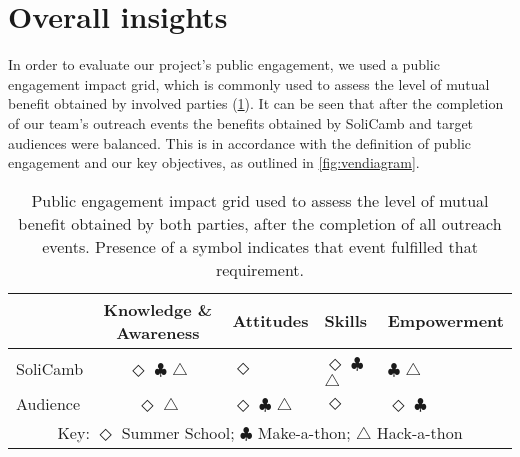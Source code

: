 \section{Overall insights}
 In order to evaluate our project's public engagement, we used a public engagement impact grid, which is commonly used to assess the level of mutual benefit obtained by involved parties (\cref{tab:impact_grid}). It can be seen that after the completion of our team's outreach events the benefits obtained by SoliCamb and target audiences were balanced. This is in accordance with the definition of public engagement and our key objectives, as outlined in \cref{fig:vendiagram}. %
 
\begin{table}[h!]
	\centering
	\begin{tabular}{l c l l l}
			\toprule
			& {Knowledge \& Awareness} 
			& {Attitudes} 
			& {Skills} 
			& {Empowerment} \\
			\midrule
			SoliCamb & $\Diamond$ $\clubsuit$ $\triangle$ 
					& \hspace{1pt} $\Diamond$  
				& $\Diamond$ $\clubsuit$ $\triangle$
				& \hspace{27pt} $\clubsuit$ $\triangle$ \\
			Audience & $\Diamond$ \hspace{7pt}  $\triangle$ 
				& \hspace{1pt} $\Diamond$ $\clubsuit$ $\triangle$
				& $\Diamond$ 
				& \hspace{18pt} $\Diamond$ $\clubsuit$ \hspace{1pt}  \\	
				\bottomrule
			\multicolumn{5}{c}{\small Key: $\Diamond$ Summer School; $\clubsuit$ Make-a-thon; $\triangle$ Hack-a-thon} \\
  		\end{tabular}
  	    	\caption{Public engagement impact grid used to assess the level of mutual benefit obtained by both parties, after the completion of all outreach events. Presence of a symbol indicates that event fulfilled that requirement.}
    	\label{tab:impact_grid}
    \end{table}



